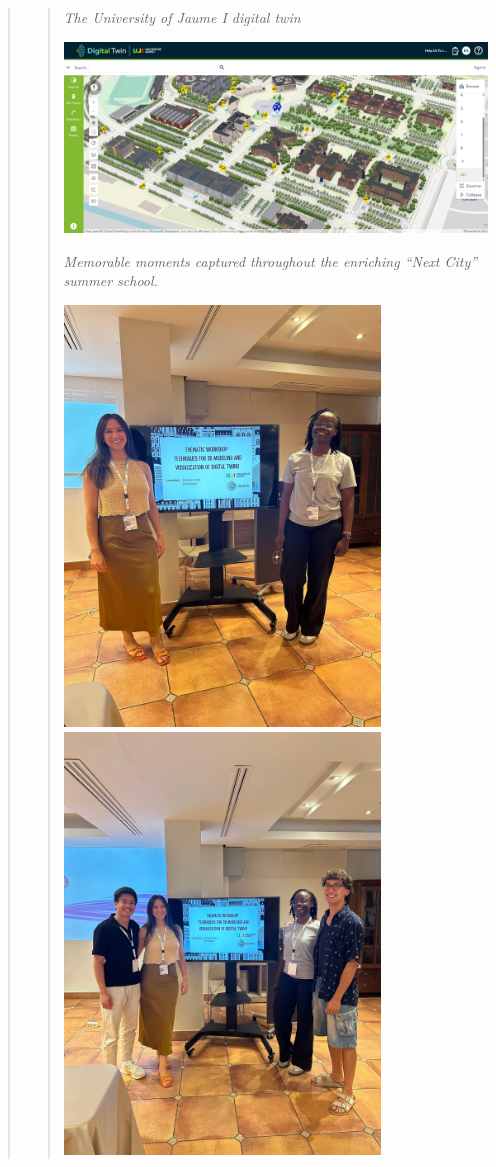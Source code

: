 \documentclass[
  letterpaper,
  DIV=11,
  numbers=noendperiod]{scrartcl}
\begin{document}
\begin{quote}
\begin{quote}
\emph{The University of Jaume I digital twin}

\includegraphics{images/clipboard-2844895517.png}

\emph{Memorable moments captured throughout the enriching ``Next City''
summer school.}

\includegraphics[width=3.30208in,height=\textheight]{images/cde rep.jpg}
\includegraphics[width=3.30208in,height=\textheight]{images/erasmus peeps.jpg}


\end{quote}
\end{quote}
\end{document}
